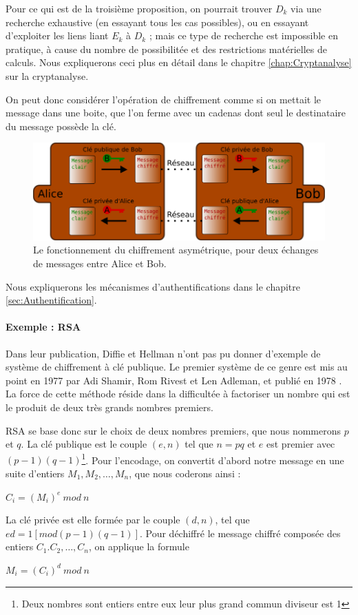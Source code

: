 Pour ce qui est de la troisième proposition, on pourrait trouver $D_k$
via une recherche exhaustive (en essayant tous les cas possibles), ou
en essayant d'exploiter les liens liant $E_k$ à $D_k$ ; mais ce type
de recherche est impossible en pratique, à cause du nombre de
possibilitée et des restrictions matérielles de calculs. Nous
expliquerons ceci plus en détail dans le chapitre
\ref{chap:Cryptanalyse} sur la cryptanalyse.

On peut donc considérer l'opération de chiffrement comme si on
mettait le message dans une boite, que l'on ferme avec un cadenas
dont seul le destinataire du message possède la clé.

\begin{figure}[h]
  \begin{center}
    \includegraphics[scale=0.5]{images/ChiffrementAsymetrique.png}
  \end{center}
  \caption{Le fonctionnement du chiffrement asymétrique, pour deux
    échanges de messages entre Alice et Bob.}
  \label{fig:ChiffrementSymetrique}
\end{figure}

Nous expliquerons les mécanismes d'authentifications dans le 
chapitre \ref{sec:Authentification}. \\

\paragraph{Exemple : RSA}
Dans leur publication, Diffie et Hellman n'ont pas pu donner
d'exemple de système de chiffrement à clé publique. Le premier
système de ce genre est mis au point en 1977 par Adi Shamir, Rom
Rivest et Len Adleman, et publié en 1978 \cite{RSAPaper}.
La force de cette méthode réside dans la difficultée à factoriser
un nombre qui est le produit de deux très grands nombres premiers. 

RSA se base donc sur le choix de deux nombres premiers, que nous
nommerons $p$ et $q$.
La clé publique est le couple $(e,n)$ tel que $n = p q$ et $e$ est
premier avec $(p-1) (q-1)$\footnote{Deux nombres sont entiers
entre eux \ssi leur plus grand commun diviseur est 1}.
Pour l'encodage, on convertit d'abord notre message en une suite
d'entiers $M_1, M_2, \dots, M_n$, %
que nous coderons ainsi :
\begin{center}
  $C_i = (M_i)^e ~mod~n$
\end{center}

La clé privée est elle formée par le couple $(d,n)$, tel que
$e d = 1 [mod (p-1) (q-1)]$.
Pour déchiffré le message chiffré composée des entiers $C_1. C_2,
\dots, C_n$, on applique la formule
\begin{center}
  $M_i = (C_i)^d ~mod~n$
\end{center}


